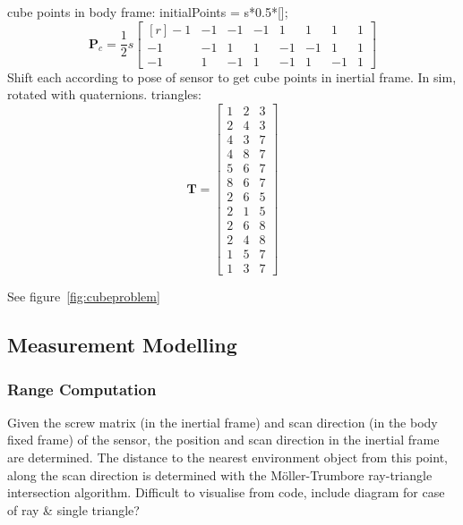 cube points in body frame:
initialPoints = s*0.5*[];
\begin{equation}
	\mathbf{P}_c = \frac{1}{2}s
	\begin{bmatrix*}[r]
		-1  &  -1  &  -1  &  -1  &   1  &   1  &   1  &  1 \\
		-1  &  -1  &   1  &   1  &  -1  &  -1  &   1  &  1 \\
		-1  &   1  &  -1  &   1  &  -1  &   1  &  -1  &  1 
	\end{bmatrix*}
\end{equation}
Shift each according to pose of sensor to get cube points in inertial frame. In sim, rotated with quaternions.
triangles:
\begin{equation}
	\mathbf{T} = 
	\begin{bmatrix}
	1 & 2 & 3 \\
	2 & 4 & 3 \\
    4 & 3 & 7 \\
    4 & 8 & 7 \\
    5 & 6 & 7 \\
    8 & 6 & 7 \\
    2 & 6 & 5 \\
    2 & 1 & 5 \\
    2 & 6 & 8 \\
    2 & 4 & 8 \\
    1 & 5 & 7 \\
    1 & 3 & 7
	\end{bmatrix}
\end{equation}

See figure~\ref{fig:cubeproblem}


\subsection{Measurement Modelling}
	\subsubsection{Range Computation}
	Given the screw matrix (in the inertial frame) and scan direction (in the body fixed frame) of the sensor, the position and scan direction in the inertial frame are determined.
	The distance to the nearest environment object from this point, along the scan direction is determined with the M{\"o}ller-Trumbore ray-triangle intersection algorithm.
	Difficult to visualise from code, include diagram for case of ray \& single triangle?

